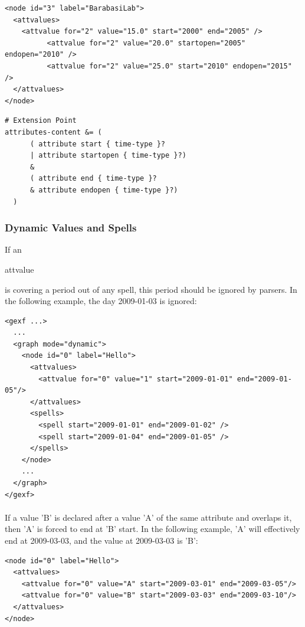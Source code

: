 \documentclass[a4paper,10pt]{article}
\begin{document}
\lstset{ style=gexf }
\begin{lstlisting}[caption={Using open and closed intervals}]
<node id="3" label="BarabasiLab">
  <attvalues>
    <attvalue for="2" value="15.0" start="2000" end="2005" />
          <attvalue for="2" value="20.0" startopen="2005" endopen="2010" />
          <attvalue for="2" value="25.0" start="2010" endopen="2015" />
  </attvalues>
</node>
\end{lstlisting}

\lstset{ style=rnc }
\begin{lstlisting}[caption={Dynamic Values Specification},label=dynvalRNC]
# Extension Point
attributes-content &= (
      ( attribute start { time-type }?
      | attribute startopen { time-type }?)
      &
      ( attribute end { time-type }?
      & attribute endopen { time-type }?)
  )
\end{lstlisting}

\subsubsection{Dynamic Values and Spells}

If an \begin{footnotesize}attvalue\end{footnotesize} is covering a period out of any spell, this period should be ignored by parsers. In the following example, the day 2009-01-03 is ignored:

\lstset{ style=gexf }
\begin{lstlisting}[caption={Spells and attvalues}]
<gexf ...>
  ...
  <graph mode="dynamic">
    <node id="0" label="Hello">
      <attvalues>
        <attvalue for="0" value="1" start="2009-01-01" end="2009-01-05"/>
      </attvalues>
      <spells>
        <spell start="2009-01-01" end="2009-01-02" />
        <spell start="2009-01-04" end="2009-01-05" />
      </spells>
    </node>
    ...
  </graph>
</gexf>
\end{lstlisting}

\paragraph{}
If a value 'B' is declared after a value 'A' of the same attribute and overlaps it, then 'A' is forced to end at 'B' start. In the following example, 'A' will effectively end at 2009-03-03, and the value at 2009-03-03 is 'B':

\lstset{ style=gexf }
\begin{lstlisting}[caption={Value overlapping}]
<node id="0" label="Hello">
  <attvalues>
    <attvalue for="0" value="A" start="2009-03-01" end="2009-03-05"/>
    <attvalue for="0" value="B" start="2009-03-03" end="2009-03-10"/>
  </attvalues>
</node>
\end{lstlisting}
\end{document}
